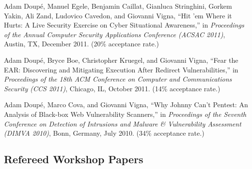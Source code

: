 \documentclass[11pt,letterpaper,sans]{moderncv}
\begin{document}
\begin{etaremune}
\item Adam Doup\'e, Manuel Egele, Benjamin Caillat, Gianluca
  Stringhini, Gorkem Yakin, Ali Zand, Ludovico Cavedon, and Giovanni
  Vigna, ``Hit 'em Where it Hurts: A Live Security Exercise on Cyber
  Situational Awareness,'' in \emph{Proceedings of the Annual Computer
    Security Applications Conference (ACSAC 2011)}, Austin, TX,
  December 2011. (20\% acceptance rate.)

\item Adam Doup\'e, Bryce Boe, Christopher Kruegel, and
  Giovanni Vigna, ``Fear the EAR: Discovering and Mitigating Execution
  After Redirect Vulnerabilities,'' in \emph{Proceedings of the 18th
    ACM Conference on Computer and Communications Security (CCS
    2011)}, Chicago, IL, October 2011. (14\% acceptance rate.)

\item Adam Doup\'e, Marco Cova, and Giovanni Vigna, ``Why
  Johnny Can't Pentest: An Analysis of Black-box Web Vulnerability
  Scanners,'' in \emph{Proceedings of the Seventh Conference on
    Detection of Intrusions and Malware \& Vulnerability Assessment
    (DIMVA 2010)}, Bonn, Germany, July 2010. (34\% acceptance rate.)
  
\end{etaremune}

\subsection{Refereed Workshop Papers}
\end{document}
